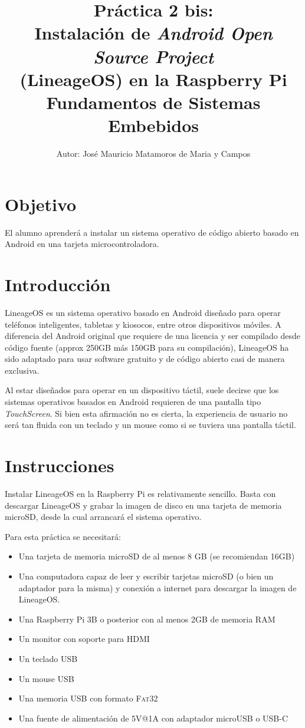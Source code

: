 \documentclass[letterpaper,10.5pt]{article}
\author{\footnotesize Autor: José Mauricio Matamoros de Maria y Campos}
\title{Práctica 2 bis:\\Instalación de \emph{Android Open Source Project}\\
(LineageOS) en la Raspberry Pi\\
{\large Fundamentos de Sistemas Embebidos}}
\date{}
\begin{document}
\maketitle

\section{Objetivo}%
\label{sec:objective}
El alumno aprenderá a instalar un sistema operativo de código abierto basado en Android en una tarjeta microcontroladora.

\section{Introducción}%
\label{sec:introduction}
LineageOS es un sistema operativo basado en Android diseñado para operar teléfonos inteligentes, tabletas y kiosocos, entre otros dispositivos móviles.
A diferencia del Android original que requiere de una licencia y ser compilado desde código fuente (approx 250GB más 150GB para su compilación), LineageOS ha sido adaptado para usar software gratuito y de código abierto casi de manera exclusiva.

Al estar diseñados para operar en un dispositivo táctil, suele decirse que los sistemas operativos basados en Android requieren de una pantalla tipo \emph{TouchScreen}.
Si bien esta afirmación no es cierta, la experiencia de usuario no será tan fluida con un teclado y un mouse como si se tuviera una pantalla táctil.

\section{Instrucciones}%
\label{sec:instructions}

Instalar LineageOS en la Raspberry Pi es relativamente sencillo.
Basta con descargar LineageOS y grabar la imagen de disco en una tarjeta de memoria microSD, desde la cual arrancará el sistema operativo.

Para esta práctica se necesitará:
\begin{itemize}[nosep]
	\item Una tarjeta de memoria microSD de al menos 8 GB (se recomiendan 16GB)
	\item Una computadora capaz de leer y escribir tarjetas microSD (o bien un adaptador para la misma) y conexión a internet para descargar la imagen de LineageOS. %
	\item Una Raspberry Pi 3B o posterior con al menos 2GB de memoria RAM
	\item Un monitor con soporte para HDMI
	\item Un teclado USB
	\item Un mouse USB
	\item Una memoria USB con formato \textsc{Fat32}
	\item Una fuente de alimentación de 5V@1A con adaptador microUSB o USB-C
\end{itemize}
\end{document}

